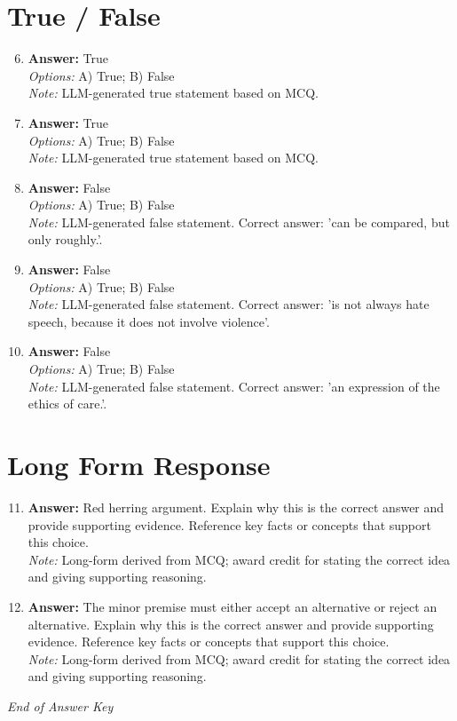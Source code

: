 \documentclass[12pt]{article}
\begin{document}
\section*{True / False}
\begin{enumerate}[label=\arabic*.]
\setcounter{enumi}{5}
\item \textbf{Answer:} True
\\ \textit{Options:} A) True; B) False
\\ \textit{Note:} LLM-generated true statement based on MCQ.
\item \textbf{Answer:} True
\\ \textit{Options:} A) True; B) False
\\ \textit{Note:} LLM-generated true statement based on MCQ.
\item \textbf{Answer:} False
\\ \textit{Options:} A) True; B) False
\\ \textit{Note:} LLM-generated false statement. Correct answer: 'can be compared, but only roughly.'.
\item \textbf{Answer:} False
\\ \textit{Options:} A) True; B) False
\\ \textit{Note:} LLM-generated false statement. Correct answer: 'is not always hate speech, because it does not involve violence'.
\item \textbf{Answer:} False
\\ \textit{Options:} A) True; B) False
\\ \textit{Note:} LLM-generated false statement. Correct answer: 'an expression of the ethics of care.'.
\end{enumerate}

\section*{Long Form Response}
\begin{enumerate}[label=\arabic*.]
\setcounter{enumi}{10}
\item \textbf{Answer:} Red herring argument. Explain why this is the correct answer and provide supporting evidence. Reference key facts or concepts that support this choice.
\\ \textit{Note:} Long-form derived from MCQ; award credit for stating the correct idea and giving supporting reasoning.
\item \textbf{Answer:} The minor premise must either accept an alternative or reject an alternative. Explain why this is the correct answer and provide supporting evidence. Reference key facts or concepts that support this choice.
\\ \textit{Note:} Long-form derived from MCQ; award credit for stating the correct idea and giving supporting reasoning.
\end{enumerate}

\vfill
\noindent\textit{End of Answer Key}
\end{document}
